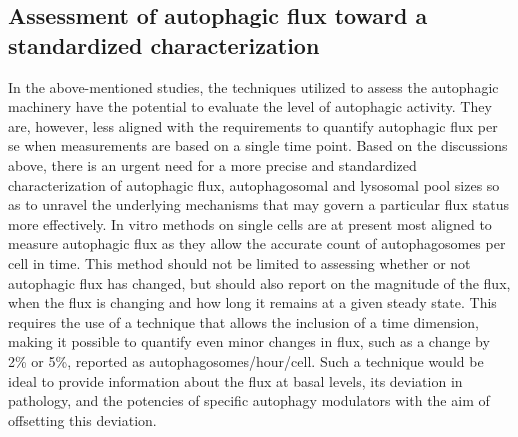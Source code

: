 \subsection{Assessment of autophagic flux  toward a standardized characterization}
In the above-mentioned studies, the techniques utilized to assess the autophagic machinery have the potential to evaluate the level of autophagic activity. They are, however, less aligned with the requirements to quantify autophagic flux per se when measurements are based on a single time point. Based on the discussions above, there is an urgent need for a more precise and standardized characterization of autophagic flux, autophagosomal and lysosomal pool sizes so as to unravel the underlying mechanisms that may govern a particular flux status more effectively. In vitro methods on single cells are at present most aligned to measure autophagic flux as they allow the accurate count of autophagosomes per cell in time. This method should not be limited to assessing whether or not autophagic flux has changed, but should also report on the magnitude of the flux, when the flux is changing and how long it remains at a given steady state. This requires the use of a technique that allows the inclusion of a time dimension, making it possible to quantify even minor changes in flux, such as a change by 2\% or 5\%, reported as autophagosomes/hour/cell. Such a technique would be ideal to provide information about the flux at basal levels, its deviation in pathology, and the potencies of specific autophagy modulators with the aim of offsetting this deviation. 

